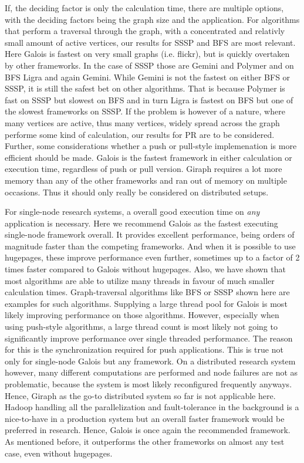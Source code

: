 If, the deciding factor is only the calculation time, there are multiple options, with the deciding factors being the graph size and the application.
For algorithms that perform a traversal through the graph, with a concentrated and relativly small amount of active vertices, our results for SSSP and BFS are most relevant.
Here Galois is fastest on very small graphs (i.e. flickr), but is quickly overtaken by other frameworks.
In the case of SSSP those are Gemini and Polymer and on BFS Ligra and again Gemini. While Gemini is not the fastest on either BFS or SSSP, it is still the safest bet on other algorithms. That is because Polymer is fast on SSSP but slowest on BFS and in turn Ligra is fastest on BFS but one of the slowest frameworks on SSSP.
If the problem is however of a nature, where many vertices are active, thus many vertices, widely spread across the graph performe some kind of calculation, our results for PR are to be considered.
Further, some considerations whether a push or pull-style implemenation is more efficient should be made.
Galois is the fastest framework in either calculation or execution time, regardless of push or pull version.
Giraph requires a lot more memory than any of the other frameworks and ran out of memory on multiple occasions. 
Thus it should only really be considered on distributed setups.

For single-node research systems, a overall good execution time on \emph{any} application is necessary. 
Here we recommend Galois as the fastest executing single-node framework overall.
It provides excellent performance, being orders of magnitude faster than the competing frameworks. And when it is possible to use hugepages, these improve performance even further, sometimes up to a factor of 2 times faster compared to Galois without hugepages.
Also, we have shown that most algorithms are able to utilize many threads in favour of much smaller calculation times. Graph-traversal algorithms like BFS or SSSP shown here are examples for such algorithms.
Supplying a large thread pool for Galois is most likely improving performance on those algorithms.
However, especially when using push-style algorithms, a large thread count is most likely not going to significantly improve performance over single threaded performance. The reason for this is the synchronization required for push applications. This is true not only for single-node Galois but any framework.
On a distributed research system however, many different computations are performed and node failures are not as problematic, because the system is most likely reconfigured frequently anyways.
Hence, Giraph as the go-to distributed system so far is not applicable here. Hadoop handling all the parallelization and fault-tolerance in the background is a nice-to-have in a production system but an overall faster framework would be preferred in research.
Hence, Galois is once again the recommended framework. As mentioned before, it outperforms the other frameworks on almost any test case, even without hugepages.



